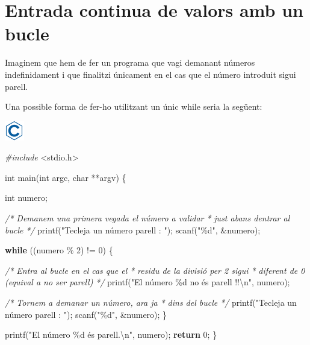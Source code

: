 \documentclass[]{book}
\newenvironment{Shaded}{\begin{snugshade}}{\end{snugshade}}
\newcommand{\CommentTok}[1]{\textcolor[rgb]{0.56,0.35,0.01}{\textit{#1}}}
\newcommand{\ControlFlowTok}[1]{\textcolor[rgb]{0.13,0.29,0.53}{\textbf{#1}}}
\newcommand{\DataTypeTok}[1]{\textcolor[rgb]{0.13,0.29,0.53}{#1}}
\newcommand{\DecValTok}[1]{\textcolor[rgb]{0.00,0.00,0.81}{#1}}
\newcommand{\ImportTok}[1]{#1}
\newcommand{\NormalTok}[1]{#1}
\newcommand{\PreprocessorTok}[1]{\textcolor[rgb]{0.56,0.35,0.01}{\textit{#1}}}
\newcommand{\SpecialCharTok}[1]{\textcolor[rgb]{0.00,0.00,0.00}{#1}}
\newcommand{\StringTok}[1]{\textcolor[rgb]{0.31,0.60,0.02}{#1}}
\begin{document}
\hypertarget{entrada-continua-de-valors-amb-un-bucle}{%
\section{Entrada continua de valors amb un bucle}\label{entrada-continua-de-valors-amb-un-bucle}}

Imaginem que hem de fer un programa que vagi demanant números indefinidament i que finalitzi únicament en el cas que el número introduit sigui parell.

Una possible forma de fer-ho utilitzant un únic while seria la següent:

\includegraphics{./img/c.png}

\begin{Shaded}
\begin{Highlighting}[]
\PreprocessorTok{\#include }\ImportTok{\textless{}stdio.h\textgreater{}}

\DataTypeTok{int}\NormalTok{ main(}\DataTypeTok{int}\NormalTok{ argc, }\DataTypeTok{char}\NormalTok{ **argv) \{}

    \DataTypeTok{int}\NormalTok{ numero;}

    \CommentTok{/* Demanem una primera vegada el número a validar}
\CommentTok{     * just abans d\textquotesingle{}entrar al bucle }
\CommentTok{     */}
\NormalTok{    printf(}\StringTok{"Tecleja un número parell : "}\NormalTok{);}
\NormalTok{    scanf(}\StringTok{"\%d"}\NormalTok{, \&numero);}

    \ControlFlowTok{while}\NormalTok{ ((numero \% }\DecValTok{2}\NormalTok{) != }\DecValTok{0}\NormalTok{) \{}

        \CommentTok{/* Entra al bucle en el cas que el}
\CommentTok{         * residu de la divisió per 2 sigui }
\CommentTok{         * diferent de 0 (equival a no ser parell) }
\CommentTok{         */}
\NormalTok{        printf(}\StringTok{"El número \%d no és parell !!}\SpecialCharTok{\textbackslash{}n}\StringTok{"}\NormalTok{, numero);}
 
        \CommentTok{/* Tornem a demanar un número, ara ja}
\CommentTok{         * dins del bucle }
\CommentTok{         */}
\NormalTok{        printf(}\StringTok{"Tecleja un número parell : "}\NormalTok{);}
\NormalTok{        scanf(}\StringTok{"\%d"}\NormalTok{, \&numero);}
\NormalTok{    \}}

\NormalTok{    printf(}\StringTok{"El número \%d és parell.}\SpecialCharTok{\textbackslash{}n}\StringTok{"}\NormalTok{, numero);}
    \ControlFlowTok{return} \DecValTok{0}\NormalTok{;}
\NormalTok{\}}
\end{Highlighting}
\end{Shaded}
\end{document}
